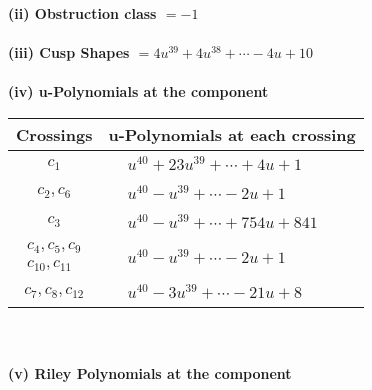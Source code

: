 \documentclass[1p]{elsarticle_modified}
\theoremstyle{definition}
\begin{document}
\flushleft \textbf{(ii) Obstruction class $= -1$}\\~\\
\flushleft \textbf{(iii) Cusp Shapes $= 4 u^{39}+4 u^{38}+\cdots-4 u+10$}\\~\\
\newpage\renewcommand{\arraystretch}{1}
\flushleft \textbf{(iv) u-Polynomials at the component}\newline \\
\begin{tabular}{m{50pt}|m{274pt}}
Crossings & \hspace{64pt}u-Polynomials at each crossing \\
\hline $$\begin{aligned}c_{1}\end{aligned}$$&$\begin{aligned}
&u^{40}+23 u^{39}+\cdots+4 u+1
\end{aligned}$\\
\hline $$\begin{aligned}c_{2},c_{6}\end{aligned}$$&$\begin{aligned}
&u^{40}- u^{39}+\cdots-2 u+1
\end{aligned}$\\
\hline $$\begin{aligned}c_{3}\end{aligned}$$&$\begin{aligned}
&u^{40}- u^{39}+\cdots+754 u+841
\end{aligned}$\\
\hline $$\begin{aligned}c_{4},c_{5},c_{9}\\c_{10},c_{11}\end{aligned}$$&$\begin{aligned}
&u^{40}- u^{39}+\cdots-2 u+1
\end{aligned}$\\
\hline $$\begin{aligned}c_{7},c_{8},c_{12}\end{aligned}$$&$\begin{aligned}
&u^{40}-3 u^{39}+\cdots-21 u+8
\end{aligned}$\\
\hline
\end{tabular}\\~\\
\newpage\renewcommand{\arraystretch}{1}
\flushleft \textbf{(v) Riley Polynomials at the component}\newline \\
\end{document}
